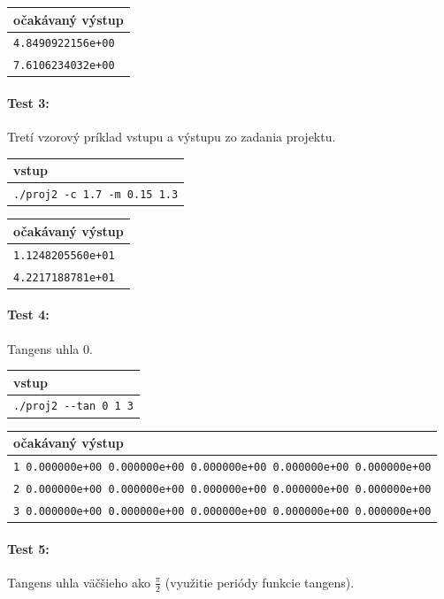 \documentclass[12pt,a4paper,titlepage,final]{article}
\begin{document}
\vspace{1em}\begin{tabular}{l}
očakávaný výstup \\
\hline
\verb|4.8490922156e+00| \\
\verb|7.6106234032e+00|
\end{tabular}

\paragraph{Test 3:} Tretí vzorový príklad vstupu a výstupu zo zadania projektu.

\vspace{1em}\begin{tabular}{l}
vstup \\
\hline
\verb|./proj2 -c 1.7 -m 0.15 1.3|
\end{tabular}

\vspace{1em}\begin{tabular}{l}
očakávaný výstup \\
\hline
\verb|1.1248205560e+01| \\
\verb|4.2217188781e+01|
\end{tabular}

\paragraph{Test 4:} Tangens uhla 0.

\vspace{1em}\begin{tabular}{l}
vstup \\
\hline
\verb|./proj2 --tan 0 1 3|
\end{tabular}

\vspace{1em}\begin{tabular}{l}
očakávaný výstup \\
\hline
\verb|1 0.000000e+00 0.000000e+00 0.000000e+00 0.000000e+00 0.000000e+00| \\
\verb|2 0.000000e+00 0.000000e+00 0.000000e+00 0.000000e+00 0.000000e+00| \\
\verb|3 0.000000e+00 0.000000e+00 0.000000e+00 0.000000e+00 0.000000e+00|
\end{tabular}

\paragraph{Test 5:} Tangens uhla väčšieho ako $\frac{\pi}{2}$ (využitie periódy funkcie tangens).
\end{document}
